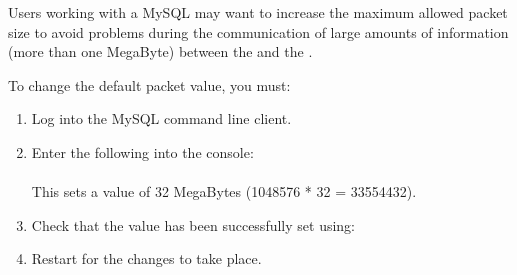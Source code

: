 Users working with a MySQL \gddb{} may want to increase the maximum allowed packet size to avoid problems during the communication of large amounts of information (more than one MegaByte) between the \gdagent{} and the \ite{}.

To change the default packet value, you must:

\begin{enumerate}
\item Log into the MySQL command line client.
\item Enter the following into the console:\\
\\
This sets a value of 32  MegaBytes (1048576 * 32 = 33554432).
\item Check that the value has been successfully set using:\\
\item Restart \app{} for the changes to take place.
\end{enumerate}
